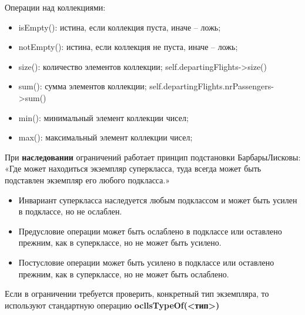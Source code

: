 Операции над коллекциями:
\begin{itemize}
    \item isEmpty(): истина, если коллекция пуста, иначе – ложь;
    \item notEmpty(): истина, если коллекция не пуста, иначе – ложь;
    \item size(): количество элементов коллекции; self.departingFlights->size()
    \item sum(): сумма элементов коллекции; self.departingFlights.nrPassengers->sum()
    \item min(): минимальный элемент коллекции чисел;
    \item max(): максимальный элемент коллекции чисел;

\end{itemize}

При \textbf{наследовании} ограничений работает принцип подстановки БарбарыЛисковы: «Где может находиться экземпляр суперкласса, туда всегда может быть подставлен экземпляр его любого подкласса.» \begin{itemize}
    \item Инвариант суперкласса наследуется любым подклассом и может быть усилен в подклассе, но не
ослаблен.
    \item Предусловие операции может быть ослаблено в подклассе или оставлено прежним, как в суперклассе, но не может быть усилено.
    \item Постусловие операции может быть усилено в подклассе или оставлено прежним, как в суперклассе, но не может быть ослаблено.
\end{itemize}
Если в ограничении требуется проверить, конкретный тип экземпляра, то используют стандартную операцию \textbf{ocllsTypeOf(<тип>)}


